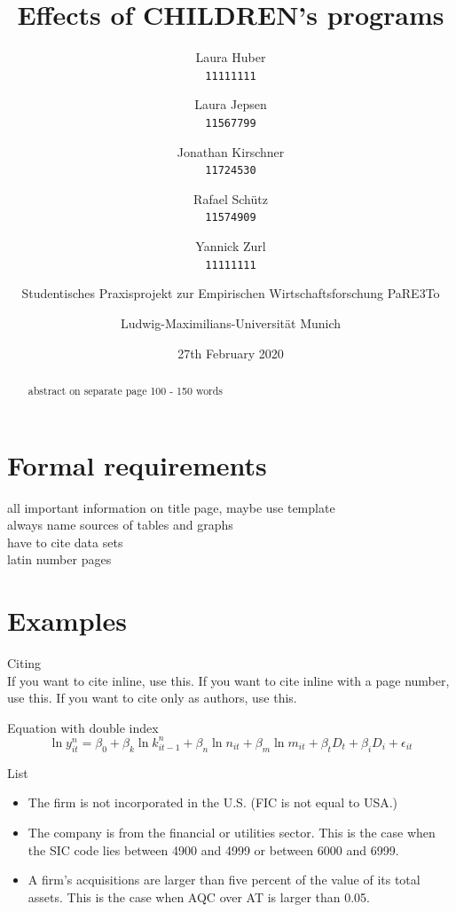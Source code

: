\documentclass[12pt, a4paper, titlepage]{article}\usepackage[]{graphicx}\usepackage[]{color}
\title{Effects of CHILDREN's programs}
\author{
Laura Huber\\
\texttt{11111111}
\and
Laura Jepsen\\
\texttt{11567799}
\and
Jonathan Kirschner\\
\texttt{11724530}
\and
Rafael Schütz\\
\texttt{11574909} 
\and 
Yannick Zurl\\
\texttt{11111111}
\and
Studentisches Praxisprojekt zur Empirischen Wirtschaftsforschung PaRE3To\\
\and
Ludwig-Maximilians-Universität Munich
}
\date{27th February 2020}
\begin{document}
\maketitle

\tableofcontents
\listoftables

\listoffigures

\begin{abstract} 
abstract on separate page
100 - 150 words
\end{abstract}

\section{Formal requirements}
all important information on title page, maybe use template\\
always name sources of tables and graphs\\
have to cite data sets\\
latin number pages\\


\section{Examples}

Citing\\

If you want to cite \textcite{Millenstein.2020} inline, use this.
If you want to cite \parencite[p.4]{Millenstein.2020} inline with a page number, use this.
If you want to cite \citeauthor{Millenstein.2020} only as authors, use this.

Equation with double index\\

\begin{equation}
\label{ModelProdu}
\ln y_{it}^{n} = \beta_0 + \beta_k \ln k_{it-1}^{n} + \beta_n \ln n_{it} + \beta_m \ln m_{it} + \beta_t D_t + \beta_i D_i + \epsilon_{it}
\end{equation}

List\\

\begin{itemize}
  \item{The firm is not incorporated in the U.S. (FIC is not equal to USA.)}
  \item{The company is from the financial or utilities sector. This is the case when the SIC code lies between 4900 and 4999 or between 6000 and 6999.}
  \item{A firm's acquisitions are larger than five percent of the value of its total assets. This is the case when AQC over AT is larger than 0.05.} 
\end{itemize}
\end{document}
